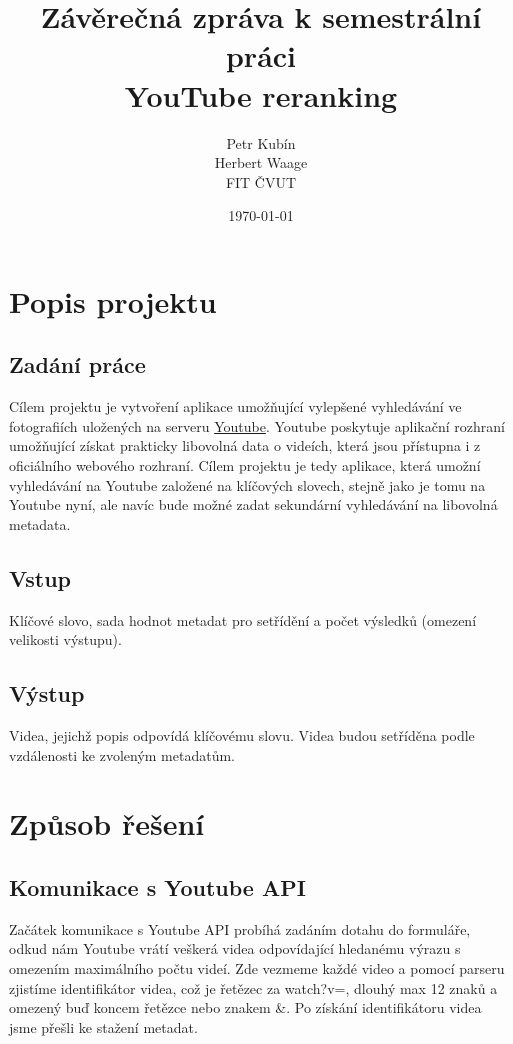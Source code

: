 \documentclass[a4paper,11pt]{article}
\title{Závěrečná zpráva k semestrální práci\\
		YouTube reranking\\}
\author{Petr Kubín\\
Herbert Waage\\
FIT ČVUT\\}
\date{\today}
\begin{document}
\maketitle
\newpage

\tableofcontents
\newpage

\section{Popis projektu}
\subsection{Zadání práce}
\par{Cílem projektu je vytvoření aplikace umožňující vylepšené vyhledávání ve fotografiích uložených na serveru \href{www.youtube.com}{Youtube}. Youtube poskytuje aplikační rozhraní umožňující získat prakticky libovolná data o videích, která jsou
přístupna i z oficiálního webového rozhraní. Cílem projektu je tedy aplikace, která umožní vyhledávání na
Youtube založené na klíčových slovech, stejně jako je tomu na Youtube nyní, ale navíc bude možné zadat
sekundární vyhledávání na libovolná metadata.}
\subsection{Vstup}
\par{Klíčové slovo, sada hodnot metadat pro setřídění a počet výsledků (omezení velikosti výstupu).}
\subsection{Výstup}
\par{Videa, jejichž popis odpovídá klíčovému slovu. Videa budou setříděna podle vzdálenosti ke zvoleným
metadatům.}

\section{Způsob řešení}
\subsection{Komunikace s Youtube API}
\par Začátek komunikace s Youtube API probíhá zadáním dotahu do formuláře, odkud nám Youtube vrátí veškerá videa odpovídající hledanému výrazu s omezením maximálního počtu videí. Zde vezmeme každé video a pomocí parseru zjistíme identifikátor videa, což je řetězec za watch?v=, dlouhý max 12 znaků a omezený buď koncem řetězce nebo znakem \&. Po získání identifikátoru videa jsme přešli ke stažení metadat. 
\end{document}

